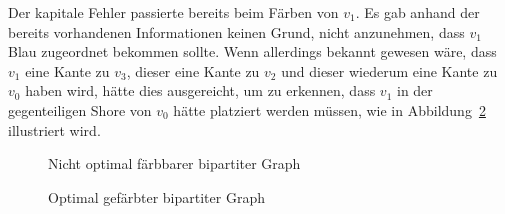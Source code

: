 \documentclass[11pt]{scrreprt} %
\theoremstyle{definition}
\begin{document}
Der kapitale Fehler passierte bereits beim Färben von $v_1$. Es gab anhand der bereits vorhandenen Informationen keinen Grund, nicht anzunehmen, dass $v_1$ Blau zugeordnet bekommen sollte. Wenn allerdings bekannt gewesen wäre, dass $v_1$ eine Kante zu $v_3$, dieser eine Kante zu $v_2$ und dieser wiederum eine Kante zu $v_0$ haben wird, hätte dies ausgereicht, um zu erkennen, dass $v_1$ in der gegenteiligen Shore von $v_0$ hätte platziert werden müssen, wie in Abbildung~\ref{bipart.greedy.besser} illustriert wird.

\begin{figure}
\caption{Nicht optimal färbbarer bipartiter Graph}
\label{bipart.greedy}

\begin{center}


\end{center}

\end{figure}

\begin{figure}
\caption{Optimal gefärbter bipartiter Graph}
\label{bipart.greedy.besser}

\begin{center}


\end{center}

\end{figure}
\end{document}
